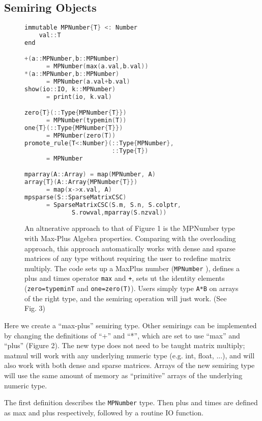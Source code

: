 \documentclass[conference]{IEEEtran}
\begin{document}
\subsection{Semiring Objects}

\begin{figure}
\begin{lstlisting}[language=c++, frame=single]
immutable MPNumber{T} <: Number
    val::T
end

+(a::MPNumber,b::MPNumber)
      = MPNumber(max(a.val,b.val))
*(a::MPNumber,b::MPNumber)
      = MPNumber(a.val+b.val)
show(io::IO, k::MPNumber)
      = print(io, k.val)

zero{T}(::Type{MPNumber{T}})
      = MPNumber(typemin(T))
one{T}(::Type{MPNumber{T}})
      = MPNumber(zero(T))
promote_rule{T<:Number}(::Type{MPNumber},
                        ::Type{T})
      = MPNumber

mparray(A::Array) = map(MPNumber, A)
array{T}(A::Array{MPNumber{T}})
      = map(x->x.val, A)
mpsparse(S::SparseMatrixCSC)
      = SparseMatrixCSC(S.m, S.n, S.colptr,
             S.rowval,mparray(S.nzval))
\end{lstlisting}
\label{fig:MP}
\caption{
An altnerative approach to that of Figure 1 is the 
MPNumber type with Max-Plus Algebra properties.  Comparing with the overloading
approach, this approach automatically works with dense and sparse matrices of any type without requiring the user to redefine matrix multiply.
The code sets up a MaxPlus number
({\tt MPNumber} ), defines a plus and times operator {\tt max} and {\tt +}, sets ut the identity elements ({\tt zero=typemin{T}} and {\tt one=zero(T)}). \newline
Users simply type {\tt A*B} on arrays of the right type, and the semiring operation will just work. (See Fig. 3)
}
\end{figure}

Here we create a ``max-plus'' semiring type.  Other semirings can be implemented
by changing the definitions of ``+'' and ``*'', which are set to use
``max'' and ``plus'' (Figure 2).
The new type does not need to be taught matrix multiply; matmul will work with
any underlying numeric type (e.g. int, float, ...), and will also work with
both dense and sparse matrices. Arrays of the new semiring type will use the
same amount of memory as ``primitive'' arrays of the underlying numeric type.

The first definition describes the \verb+MPNumber+ type.
Then plus and times are defined as max and plus respectively, followed by
a routine IO function.
\end{document}

